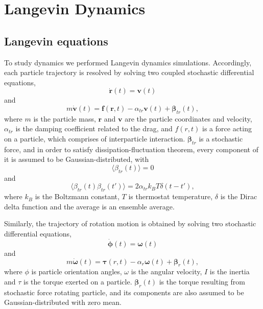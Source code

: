 \section{Langevin Dynamics}
\label{sec:langevin_dynamics}

\subsection{Langevin equations}
\label{subsec:langevin_equations}
To study dynamics we performed Langevin dynamics simulations. Accordingly, each particle trajectory is resolved by solving two coupled stochastic differential equations,
\begin{equation}
\label{eq:langevin_theory_1}
	\dot{\boldsymbol{r}}(t) = \boldsymbol{v}(t)
\end{equation}
and
\begin{equation}
\label{eq:langevin_theory_2}
	m \dot{\boldsymbol{v}}(t) = \boldsymbol{f}(\boldsymbol{r}, t) - \alpha_{tr} \boldsymbol{v}(t) + \boldsymbol{\beta}_{tr}(t)
	,
\end{equation}
where $m$ is the particle mass, $\boldsymbol{r}$ and $\boldsymbol{v}$ are the particle coordinates and velocity,  $\alpha_{tr}$ is the damping coefficient related to the drag, and $f(r, t)$ is a force acting on a particle, which comprises of interparticle interaction. $\boldsymbol{\beta}_{tr}$ is a stochastic force, and in order to satisfy dissipation-fluctuation theorem, every component of it is assumed to be Gaussian-distributed, with
\begin{equation}
\langle\beta_{tr}(t)\rangle = 0
\end{equation}
and
\begin{equation}
\label{eq:stochastic_term_dispersion}
	\langle\beta_{tr}(t)\beta_{tr}(t')\rangle = 2 \alpha_{tr} k_B 		T\delta(t - t')
	,
\end{equation}
where $k_B$ is the Boltzmann constant, $T$ is thermostat temperature, $\delta$ is the Dirac delta function and the average is an ensemble average.

Similarly, the trajectory of rotation motion is obtained by solving two stochastic differential equations,
\begin{equation}
\label{eq:langevin_theory_3}
	\dot{\boldsymbol{\phi}}(t) = \boldsymbol{\omega}(t)
\end{equation}
and
\begin{equation}
\label{eq:langevin_theory_4}
	m \dot{\boldsymbol{\omega}}(t) = \boldsymbol{\tau}(r, t) - \alpha_{r} \boldsymbol{\omega}(t) + \boldsymbol{\beta}_{r}(t)
	,
\end{equation}
where $\phi$ is particle orientation angles, $\omega$ is the angular velocity, $I$ is the inertia and $\tau$ is the torque exerted on a particle. $\boldsymbol{\beta}_{r}(t)$ is the torque resulting from stochastic force rotating particle, and its components are also assumed to be Gaussian-distributed with zero mean.

